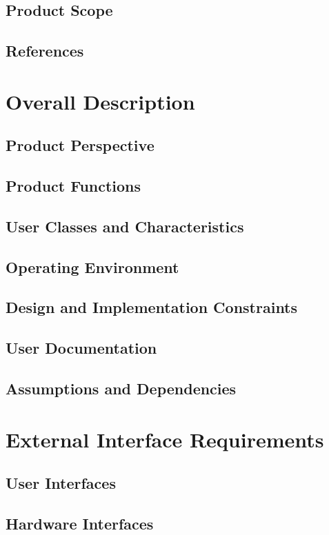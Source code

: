 \documentclass[english]{article}
\numberwithin{equation}{section} %
\begin{document}
\subsection{Product Scope}
\subsection{References}

\newpage
\section{Overall Description}
\subsection{Product Perspective}
\subsection{Product Functions}
\subsection{User Classes and Characteristics}
\subsection{Operating Environment}
\subsection{Design and Implementation Constraints}
\subsection{User Documentation}
\subsection{Assumptions and Dependencies}

\newpage
\section{External Interface Requirements}
\subsection{User Interfaces}
\subsection{Hardware Interfaces}
\end{document}
